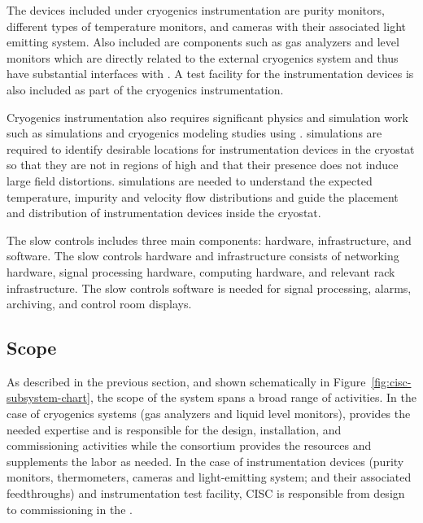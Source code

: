 The devices included under cryogenics instrumentation are purity monitors,  different types of temperature monitors, and cameras with their associated light emitting system. Also included are components such as gas analyzers and \lar level monitors which are directly related to the external cryogenics system and thus have substantial interfaces with . A test facility for the instrumentation devices is also included as part of the cryogenics instrumentation.

Cryogenics instrumentation also requires significant physics and
simulation work such as \efield simulations and cryogenics modeling
studies using . \efield simulations
are required to identify desirable locations for instrumentation
devices in the cryostat so that they are not in regions of high \efield and that their presence does not induce large field distortions. 
 simulations are needed to understand the expected temperature, impurity and velocity flow distributions and guide the placement and distribution of instrumentation devices inside the cryostat.

The slow controls includes three main components: hardware, infrastructure, and software. The slow controls hardware and infrastructure consists of networking hardware, signal processing hardware, computing hardware, and relevant rack infrastructure. The slow controls software is needed for signal processing, alarms, archiving, and control room displays.

\subsection{Scope}

As described in the previous section, and shown schematically in Figure~\ref{fig:cisc-subsystem-chart}, the scope of the  system spans a broad range of activities. In the case of cryogenics systems (gas analyzers and liquid level monitors),  provides the needed expertise and is responsible for the design, installation, and commissioning activities while the  consortium provides the resources and supplements the labor as needed. In the case of  instrumentation devices (purity monitors, thermometers, cameras and light-emitting system; and their associated feedthroughs) and instrumentation test facility, CISC is responsible from design to commissioning in the .

